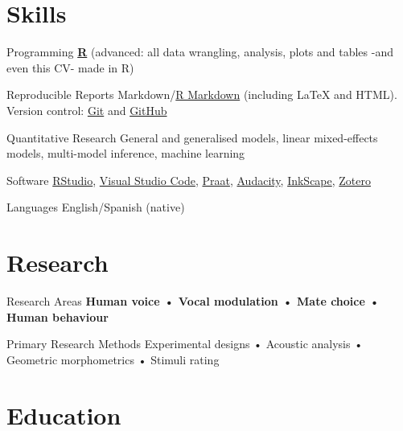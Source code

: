 \documentclass[11pt,a4paper,]{awesome-cv}
\begin{document}
\hypertarget{skills}{%
\section{Skills}\label{skills}}

\begin{cvskills}
  \cvskill
    {Programming}
    {\href{https://www.r-project.org/}{\textbf{R}} (advanced: all data wrangling, analysis, plots and tables -and even this CV- made in R)}

  \cvskill
    {Reproducible Reports}
    {Markdown/\href{https://rmarkdown.rstudio.com/}{R Markdown} (including {\selectfont\LaTeX} and HTML). Version control: \href{https://git-scm.com/}{Git} \faGit* and \href{https://github.com/JDLeongomez}{GitHub} \faGithub}

  \cvskill
    {Quantitative Research}
    {General and generalised models, linear mixed-effects models, multi-model inference, machine learning}

  \cvskill
    {Software}
    {\href{https://posit.co/products/open-source/rstudio/}{RStudio}, \href{https://code.visualstudio.com/}{Visual Studio Code}, \href{https://www.fon.hum.uva.nl/praat/}{Praat}, \href{https://www.audacityteam.org/}{Audacity}, \href{https://inkscape.org/}{InkScape}, \href{https://www.zotero.org/}{Zotero}}

  \cvskill
    {Languages}
    {English/Spanish (native)}
\end{cvskills}

\hypertarget{research}{%
\section{Research}\label{research}}

\begin{cvskills}
  \cvskill
    {Research Areas}
    {\textbf{Human voice • Vocal modulation • Mate choice • Human behaviour}}

  \cvskill
    {Primary Research Methods}
    {Experimental designs • Acoustic analysis • Geometric morphometrics • Stimuli rating}
\end{cvskills}

\hypertarget{education}{%
\section{Education}\label{education}}
\end{document}
